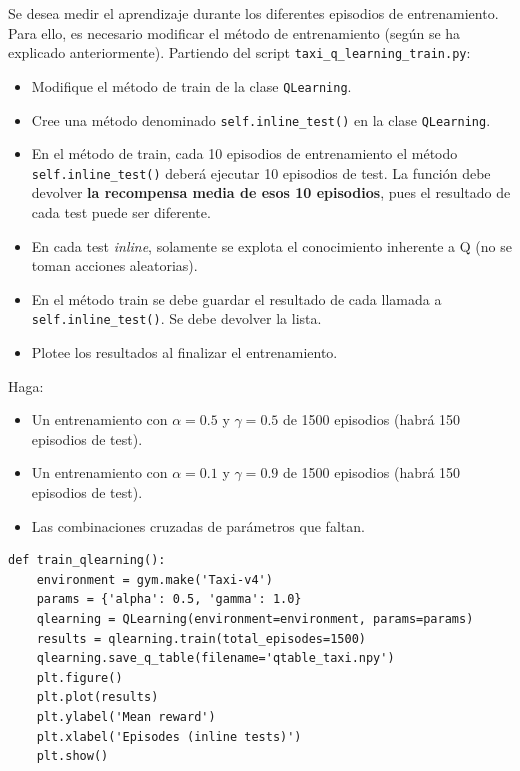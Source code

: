 \documentclass{article}
\begin{document}
\begin{exercise}
Se desea medir el aprendizaje durante los diferentes episodios de entrenamiento. Para ello, es necesario modificar el método de entrenamiento (según se ha explicado anteriormente). Partiendo del script \texttt{taxi\_q\_learning\_train.py}: 
\begin{itemize}
    \item Modifique el método de train de la clase \texttt{QLearning}.
    \item Cree una método denominado \texttt{self.inline\_test()} en la clase \texttt{QLearning}. 
    \item En el método de train, cada 10 episodios de entrenamiento el método \texttt{self.inline\_test()} deberá ejecutar 10 episodios de test. La función debe devolver \textbf{la recompensa media de esos 10 episodios}, pues el resultado de cada test puede ser diferente.
    \item En cada test \textit{inline}, solamente se explota el conocimiento inherente a Q (no se toman acciones aleatorias).
    \item En el método train se debe guardar el resultado de cada llamada a \texttt{self.inline\_test()}. Se debe devolver la lista.
     \item Plotee los resultados al finalizar el entrenamiento.
\end{itemize}
Haga:
\begin{itemize}
    \item Un entrenamiento con $\alpha=0.5$ y $\gamma=0.5$ de 1500 episodios (habrá 150 episodios de test).
    \item Un entrenamiento con $\alpha=0.1$ y $\gamma=0.9$ de 1500 episodios (habrá 150 episodios de test).
    \item Las combinaciones cruzadas de parámetros que faltan.
\end{itemize}
\begin{verbatim}
def train_qlearning():
    environment = gym.make('Taxi-v4')
    params = {'alpha': 0.5, 'gamma': 1.0}
    qlearning = QLearning(environment=environment, params=params)
    results = qlearning.train(total_episodes=1500)
    qlearning.save_q_table(filename='qtable_taxi.npy')
    plt.figure()
    plt.plot(results)
    plt.ylabel('Mean reward')
    plt.xlabel('Episodes (inline tests)')
    plt.show()
\end{verbatim}
\end{exercise}
\end{document}
